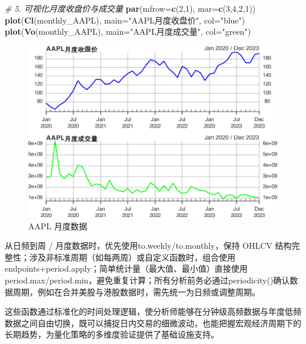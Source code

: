 \documentclass[]{ctexbook}
\newenvironment{Shaded}{\begin{snugshade}}{\end{snugshade}}
\newcommand{\AttributeTok}[1]{\textcolor[rgb]{0.13,0.29,0.53}{#1}}
\newcommand{\CommentTok}[1]{\textcolor[rgb]{0.56,0.35,0.01}{\textit{#1}}}
\newcommand{\DecValTok}[1]{\textcolor[rgb]{0.00,0.00,0.81}{#1}}
\newcommand{\FunctionTok}[1]{\textcolor[rgb]{0.13,0.29,0.53}{\textbf{#1}}}
\newcommand{\NormalTok}[1]{#1}
\newcommand{\StringTok}[1]{\textcolor[rgb]{0.31,0.60,0.02}{#1}}
\begin{document}
\begin{Shaded}
\begin{Highlighting}[]
\CommentTok{\# 5. 可视化月度收盘价与成交量}
\FunctionTok{par}\NormalTok{(}\AttributeTok{mfrow=}\FunctionTok{c}\NormalTok{(}\DecValTok{2}\NormalTok{,}\DecValTok{1}\NormalTok{), }\AttributeTok{mar=}\FunctionTok{c}\NormalTok{(}\DecValTok{3}\NormalTok{,}\DecValTok{4}\NormalTok{,}\DecValTok{2}\NormalTok{,}\DecValTok{1}\NormalTok{))}
\FunctionTok{plot}\NormalTok{(}\FunctionTok{Cl}\NormalTok{(monthly\_AAPL), }\AttributeTok{main=}\StringTok{"AAPL月度收盘价"}\NormalTok{, }\AttributeTok{col=}\StringTok{"blue"}\NormalTok{)}
\FunctionTok{plot}\NormalTok{(}\FunctionTok{Vo}\NormalTok{(monthly\_AAPL), }\AttributeTok{main=}\StringTok{"AAPL月度成交量"}\NormalTok{, }\AttributeTok{col=}\StringTok{"green"}\NormalTok{)}
\end{Highlighting}
\end{Shaded}

\begin{figure}
\includegraphics[width=0.9\linewidth]{quantmod_files/figure-latex/vismaxvol-1} \caption{AAPL 月度数据}\label{fig:vismaxvol}
\end{figure}

从日频到周 / 月度数据时，优先使用to.weekly/to.monthly，保持 OHLCV 结构完整性；涉及非标准周期（如每两周）或自定义函数时，组合使用endpoints+period.apply；简单统计量（最大值、最小值）直接使用period.max/period.min，避免重复计算；所有分析前务必通过periodicity()确认数据周期，例如在合并美股与港股数据时，需先统一为日频或调整周期。

这些函数通过标准化的时间处理逻辑，使分析师能够在分钟级高频数据与年度低频数据之间自由切换，既可以捕捉日内交易的细微波动，也能把握宏观经济周期下的长期趋势，为量化策略的多维度验证提供了基础设施支持。
\end{document}
